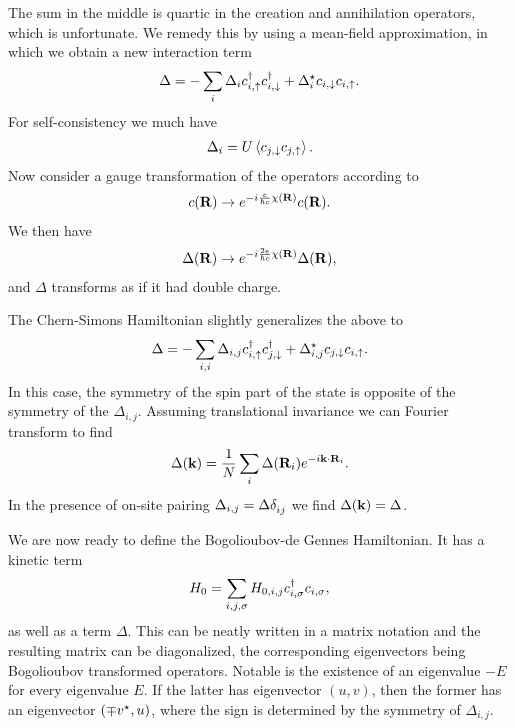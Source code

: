 The sum in the middle is quartic in the creation and annihilation operators, which is unfortunate. We remedy this by using a mean-field approximation, in which we obtain a new interaction term
\begin{align*}
	\Delta = -\sum\limits_{i}\Delta_{i}c_{i, \uparrow}^{\dagger} c_{i, \downarrow}^{\dagger} + \Delta_{i}^{\star} c_{i, \downarrow}c_{i, \uparrow}.
\end{align*}
For self-consistency we much have
\begin{align*}
	\Delta_{i} = U\expval{c_{j, \downarrow}c_{j, \uparrow}}.
\end{align*}
Now consider a gauge transformation of the operators according to
\begin{align*}
	c(\vb{R})\to e^{-i\frac{e}{\hbar c}\chi(\vb{R})}c(\vb{R}).
\end{align*}
We then have
\begin{align*}
	\Delta(\vb{R})\to e^{-i\frac{2e}{\hbar c}\chi(\vb{R})}\Delta(\vb{R}),
\end{align*}
and $\Delta$ transforms as if it had double charge.

The Chern-Simons Hamiltonian slightly generalizes the above to
\begin{align*}
	\Delta = -\sum\limits_{i, i}\Delta_{i, j}c_{i, \uparrow}^{\dagger} c_{j, \downarrow}^{\dagger} + \Delta_{i, j}^{\star} c_{j, \downarrow}c_{i, \uparrow}.
\end{align*}
In this case, the symmetry of the spin part of the state is opposite of the symmetry of the $\Delta_{i, j}$. Assuming translational invariance we can Fourier transform to find
\begin{align*}
	\Delta(\vb{k}) = \frac{1}{N}\sum\limits_{i}\Delta(\vb{R}_{i})e^{-i\vb{k}\cdot\vb{R}_{i}}.
\end{align*}
In the presence of on-site pairing $\Delta_{i, j} = \Delta\kdelta{}{ij}$ we find $\Delta(\vb{k}) = \Delta$.

We are now ready to define the Bogolioubov-de Gennes Hamiltonian. It has a kinetic term
\begin{align*}
	H_{0} = \sum\limits_{i, j, \sigma}H_{0, i, j}c_{i, \sigma}^{\dagger} c_{i, \sigma},
\end{align*}
as well as a term $\Delta$. This can be neatly written in a matrix notation and the resulting matrix can be diagonalized, the corresponding eigenvectors being Bogolioubov transformed operators. Notable is the existence of an eigenvalue $-E$ for every eigenvalue $E$. If the latter has eigenvector $(u, v)$, then the former has an eigenvector $(\mp v^{\star}, u)$, where the sign is determined by the symmetry of $\Delta_{i, j}$.

